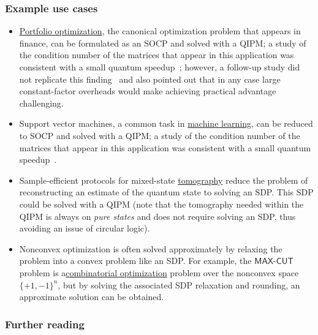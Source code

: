\begin{refsection}
\subsubsection*{Example use cases}
\begin{itemize}
    \item \hyperref[appl:PortfolioOptimization]{Portfolio optimization}, the canonical optimization problem that appears in finance, can be formulated as an SOCP and solved with a QIPM; a study of the condition number of the matrices that appear in this application was consistent with a small quantum speedup~\cite{kerenidis2019PortfolioOptimization}; however, a follow-up study did not replicate this finding~\cite{dalzell2022socp} and also pointed out that in any case large constant-factor overheads would make achieving practical advantage challenging. 
    \item Support vector machines, a common task in \hyperref[appl:ClassicalML]{machine learning}, can be reduced to SOCP and solved with a QIPM; a study of the condition number of the matrices that appear in this application was consistent with a small quantum speedup~\cite{kerenidis2019QAlgsSecondOrderConeSVM}. 
    \item Sample-efficient protocols for mixed-state \hyperref[prim:Tomography]{tomography} reduce the problem of reconstructing an estimate of the quantum state to solving an SDP. This SDP could be solved with a QIPM (note that the tomography needed within the QIPM is always on \emph{pure states} and does not require solving an SDP, thus avoiding an issue of circular logic).
    \item Nonconvex optimization is often solved approximately by relaxing the problem into a convex problem like an SDP. For example, the $\mathsf{MAX}$-$\mathsf{CUT}$ problem is  a\hyperref[appl:CombOpt]{combinatorial optimization} problem over the nonconvex space $\{+1,-1\}^n$, but by solving the associated SDP relaxation and rounding, an approximate solution can be obtained. 
\end{itemize}


\subsubsection*{Further reading}


\end{refsection}
